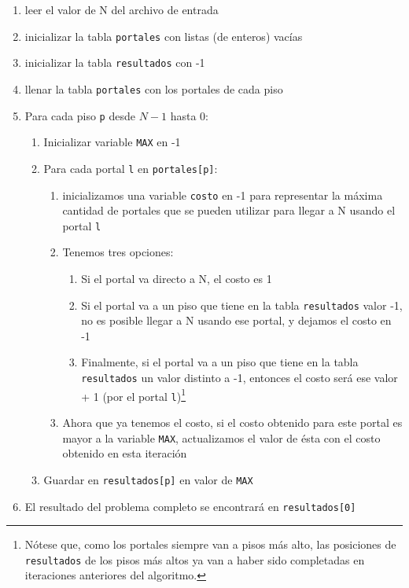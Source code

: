 \begin{enumerate}[label*=\bfseries\arabic*.]
 \item leer el valor de N del archivo de entrada
 \item inicializar la tabla \texttt{portales} con listas (de enteros) vacías
 \item inicializar la tabla \texttt{resultados} con -1
 \item llenar la tabla \texttt{portales} con los portales de cada piso
 \item Para cada piso \texttt{p} desde $N-1$ hasta 0:
 \begin{enumerate}[label*=\bfseries\arabic*.]
    \item Inicializar variable \texttt{MAX} en -1
    \item Para cada portal \texttt{l} en \texttt{portales[p]}:
    \begin{enumerate}[label*=\bfseries\arabic*.]
      \item inicializamos una variable \texttt{costo} en -1 para representar la máxima cantidad de portales que se pueden utilizar para llegar a N usando el portal \texttt{l}
      \item Tenemos tres opciones:
      \begin{enumerate}[label*=\bfseries\arabic*.]
	\item Si el portal va directo a N, el costo es 1
	\item Si el portal va a un piso que tiene en la tabla \texttt{resultados} valor -1, no es posible llegar a N usando ese portal, y dejamos el costo en -1
	\item Finalmente, si el portal va a un piso que tiene en la tabla \texttt{resultados} un valor distinto a -1, entonces el costo será ese valor + 1 (por el portal \texttt{l})\footnote{Nótese que, como los portales siempre van a pisos más alto, las posiciones de \texttt{resultados} de los pisos más altos ya van a haber sido completadas en iteraciones anteriores del algoritmo.} 
      \end{enumerate}

      \item Ahora que ya tenemos el costo, si el costo obtenido para este portal es mayor a la variable \texttt{MAX}, actualizamos el valor de ésta con el costo obtenido en esta iteración
    \end{enumerate}
    \item Guardar en \texttt{resultados[p]} en valor de \texttt{MAX}
 \end{enumerate}
 \item El resultado del problema completo se encontrará en \texttt{resultados[0]}
\end{enumerate}


